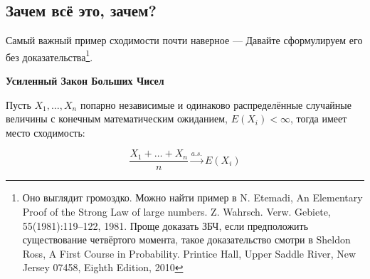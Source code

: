 




















\subsection{Зачем всё это, зачем?}

Самый важный пример сходимости почти наверное ---  Давайте сформулируем его без доказательства\footnote{Оно выглядит громоздко. Можно найти пример в N. Etemadi, An Elementary Proof of the Strong Law of large numbers. Z. Wahrsch. Verw. Gebiete, 55(1981):119--122, 1981. \newline Проще доказать ЗБЧ, если предположить существование четвёртого момента, такое доказательство смотри в Sheldon Ross, A First Course in Probability. Printice Hall, Upper Saddle River, New Jersey 07458, Eighth Edition, 2010}. 

\begin{theorem}{\textbf{Усиленный Закон Больших Чисел}}

Пусть $X_1, \ldots, X_n$ попарно независимые и одинаково распределённые случайные величины с конечным математическим ожиданием, $E(X_i) < \infty$, тогда имеет место сходимость:

$$
\frac{X_1 + \ldots + X_n}{n} \overset{a.s.}{\to} E(X_i)
$$
\end{theorem}

